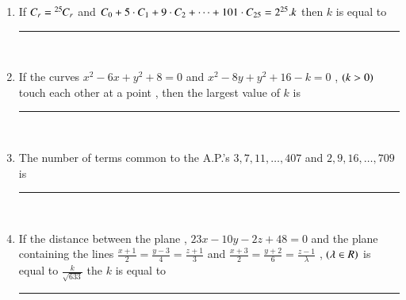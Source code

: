 \documentclass[journal]{IEEEtran}
\begin{document}
\begin{enumerate}
   \item If ${{}^{}\mkern-1muC_{r}} = {{}^{25}\mkern-1muC_{r}}$ and ${{}^{}\mkern-1muC_{0}}+ 5 \cdot {{}^{}\mkern-1muC_{1}}+ 9 \cdot {{}^{}\mkern-1muC_{2}}+ \dots + 101 \cdot {{}^{}\mkern-1muC_{25}} = 2^{25}. k $ then $k$ is equal to \rule{1cm}{0.15mm}\\


   \item If the curves $x^2-6x+y^2+8=0$ and $x^2-8y+y^2+16-k=0$ , $\left(k>0\right)$ touch each other at a point , then the largest value of $k$ is \rule{1cm}{0.15mm}\\

   \item The number of terms common to the A.P.'s $3,7,11,\dots , 407$ and $2,9,16,\dots , 709$ is \rule{1cm}{0.15mm}\\


   \item If the distance between the plane , $23x-10y-2z+48=0$ and the plane containing the lines $\frac{x+1}{2} = \frac{y-3}{4} = \frac{z+1}{3}$ and $\frac{x+3}{2} = \frac{y+2}{6} = \frac{z-1}{\lambda}$ , $\left(\lambda \in R\right)$ is equal to $\frac{k}{\sqrt{633}}$ the $k$ is equal to \rule{1cm}{0.15mm}\\
\end{enumerate}
\end{document}
